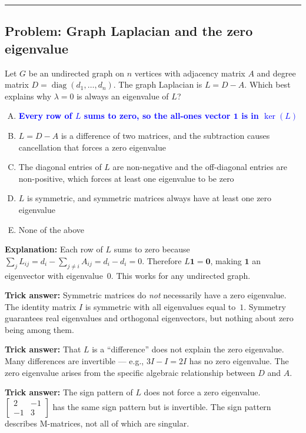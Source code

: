 \documentclass[12pt]{amsart}
\newcommand{\divider}{
  \vspace{-1em}
  \noindent
  \raisebox{-0.15ex}{\textbullet}%
  \hspace{0.5em}%
  \rule[0.5ex]{0.95\textwidth}{1.0pt}%
  \hspace{0.5em}%
  \raisebox{-0.15ex}{\textbullet}%
  \vspace{0em}
}
\begin{document}
\divider

\subsection*{Problem: Graph Laplacian and the zero eigenvalue}

Let $G$ be an undirected graph on $n$ vertices with adjacency matrix $A$
and degree matrix $D = \operatorname{diag}(d_1, \ldots, d_n)$. The graph
Laplacian is $L = D - A$.
Which best explains why $\lambda = 0$ is always an eigenvalue of $L$?

\begin{enumerate}[(A)]
\item \textcolor{blue}{\textbf{Every row of $L$ sums to zero, so the
      all-ones vector $\mathbf{1}$ is in $\ker(L)$}}
\item $L = D - A$ is a difference of two matrices, and the subtraction
      causes cancellation that forces a zero eigenvalue
\item The diagonal entries of $L$ are non-negative and the off-diagonal
      entries are non-positive, which forces at least one eigenvalue to
      be zero
\item $L$ is symmetric, and symmetric matrices always have at least one
      zero eigenvalue
\item None of the above
\end{enumerate}

\textbf{Explanation:}
Each row of $L$ sums to zero because
$\sum_j L_{ij} = d_i - \sum_{j \neq i} A_{ij} = d_i - d_i = 0$.
Therefore $L\mathbf{1} = \mathbf{0}$, making $\mathbf{1}$ an eigenvector
with eigenvalue~$0$. This works for any undirected graph.

\textbf{Trick answer:}
Symmetric matrices do \emph{not} necessarily have a zero eigenvalue.
The identity matrix $I$ is symmetric with all eigenvalues equal to~$1$.
Symmetry guarantees real eigenvalues and orthogonal eigenvectors, but
nothing about zero being among them.

\textbf{Trick answer:}
That $L$ is a ``difference'' does not explain the zero eigenvalue.
Many differences are invertible --- e.g., $3I - I = 2I$ has no zero
eigenvalue. The zero eigenvalue arises from the specific algebraic
relationship between $D$ and $A$.

\textbf{Trick answer:}
The sign pattern of $L$ does not force a zero eigenvalue.
$\begin{bmatrix} 2 & -1 \\ -1 & 3 \end{bmatrix}$ has the same sign
pattern but is invertible. The sign pattern describes M-matrices, not
all of which are singular.
\end{document}
